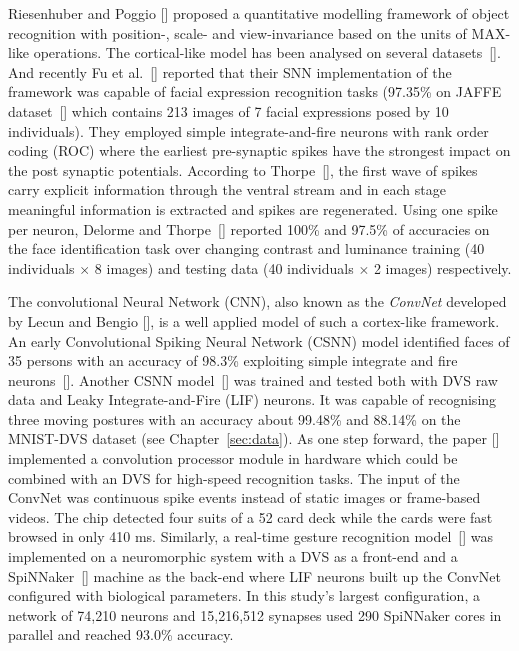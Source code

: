 Riesenhuber and Poggio [\cite{riesenhuber1999hierarchical}] proposed a quantitative modelling framework of object recognition with position-, scale- and view-invariance based on the units of MAX-like operations.
The cortical-like model has been analysed on several datasets~[\cite{serre2007robust}].
And recently Fu et al.~[\cite{fu_spiking_2012}] reported that their SNN implementation of the framework was capable of facial expression recognition tasks (97.35\% on JAFFE dataset~[\cite{lyons1998coding}] which contains 213 images of 7 facial expressions posed by 10 individuals).
They employed simple integrate-and-fire neurons with rank order coding (ROC) where  the earliest pre-synaptic spikes have the strongest impact on the post synaptic potentials.
According to Thorpe~[\cite{vanrullen_surfing_2002}], the first wave of spikes  carry explicit information through the ventral stream and in each stage meaningful information is extracted and spikes are regenerated. 
Using one spike per neuron, Delorme and Thorpe~[\cite{delorme_face_2001}] reported 100\% and 97.5\% of accuracies on the face identification task over changing  contrast and luminance training (40 individuals $\times$ 8 images) and testing data  (40 individuals $\times$ 2 images) respectively.

The convolutional Neural Network (CNN), also known as the \textit{ConvNet} developed by Lecun and Bengio [\cite{lecun1995convolutional}], is a well applied model of such a cortex-like framework.
An early Convolutional Spiking Neural Network (CSNN) model identified faces of 35 persons with an accuracy of 98.3\% exploiting simple integrate and fire neurons~[\cite{matsugu2002convolutional}].
Another CSNN model~[\cite{zhao_feedforward_2014}] was trained and tested both with DVS raw data and Leaky Integrate-and-Fire (LIF) neurons.
It was capable of recognising three moving postures with an accuracy about 99.48\% and 88.14\% on the MNIST-DVS dataset (see Chapter~\ref{sec:data}).
As one step forward, the paper [\cite{camunas2012event}] implemented a convolution processor module in hardware which could be combined with an DVS for high-speed recognition tasks.
The input of the ConvNet was continuous spike events instead of static images or frame-based videos. 
The chip detected four suits of a 52 card deck while the cards were fast browsed in only 410 ms.
Similarly, a real-time gesture recognition model~[\cite{liu2014real}] was implemented on a neuromorphic system with a DVS as a front-end and a SpiNNaker~[\cite{furber2013overview}] machine as the back-end where LIF neurons built up the ConvNet configured with biological parameters.
In this study's largest configuration, a network of 74,210 neurons and 15,216,512 synapses used 290 SpiNNaker cores in parallel and reached 93.0\% accuracy. 

